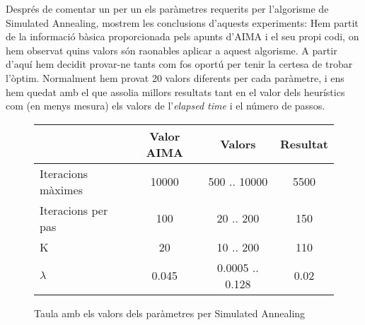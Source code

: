 Després de comentar un per un els paràmetres requerits per l'algorisme de Simulated Annealing, mostrem les conclusions d'aquests experiments: Hem partit de la informació bàsica proporcionada pels apunts d'AIMA i el seu propi codi, on hem observat quins valors són raonables aplicar a aquest algorisme. A partir d'aquí hem decidit provar-ne tants com fos oportú per tenir la certesa de trobar l'òptim. Normalment hem provat 20 valors diferents per cada paràmetre, i ens hem quedat amb el que assolia millors resultats tant en el valor dels heurístics com (en menys mesura) els valors de l'\emph{elapsed time} i el número de passos.
\begin{figure}[ht]
  \caption{Taula amb els valors dels paràmetres per Simulated Annealing}
	\label{fig:resumSA}
  \begin{center}
    \begin{tabular}{| l | c | c | c |}
      \hline
      						& \textbf{Valor AIMA}    & \textbf{Valors} & \textbf{Resultat} \\ \hline
      Iteracions màximes 	& 10000 & 500 .. 10000 		& 5500 \\ \hline
      Iteracions per pas 	& 100 	& 20 .. 200 		& 150 \\ \hline
      K 					& 20 	& 10 .. 200 		& 110 \\ \hline
      $\lambda$ 			& 0.045 & 0.0005 .. 0.128 	& 0.02 \\ \hline
    \end{tabular}
  \end{center}
\end{figure}

\newpage

